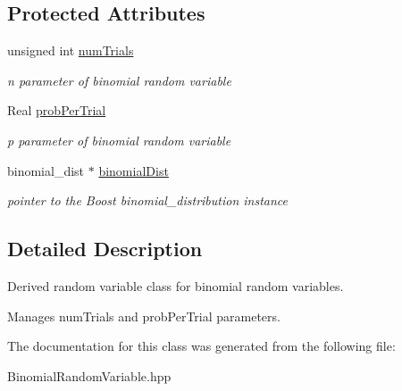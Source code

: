 \subsection*{Protected Attributes}
\begin{DoxyCompactItemize}
\item 
unsigned int \hyperlink{classPecos_1_1BinomialRandomVariable_ae7284c5049f25d6872f8fbe98c855e0c}{num\+Trials}\label{classPecos_1_1BinomialRandomVariable_ae7284c5049f25d6872f8fbe98c855e0c}

\begin{DoxyCompactList}\small\item\em n parameter of binomial random variable \end{DoxyCompactList}\item 
Real \hyperlink{classPecos_1_1BinomialRandomVariable_a034cce918fd6c1433e74212387527794}{prob\+Per\+Trial}\label{classPecos_1_1BinomialRandomVariable_a034cce918fd6c1433e74212387527794}

\begin{DoxyCompactList}\small\item\em p parameter of binomial random variable \end{DoxyCompactList}\item 
binomial\+\_\+dist $\ast$ \hyperlink{classPecos_1_1BinomialRandomVariable_ad960997d630c90336be0ddf0deda3cd0}{binomial\+Dist}\label{classPecos_1_1BinomialRandomVariable_ad960997d630c90336be0ddf0deda3cd0}

\begin{DoxyCompactList}\small\item\em pointer to the Boost binomial\+\_\+distribution instance \end{DoxyCompactList}\end{DoxyCompactItemize}


\subsection{Detailed Description}
Derived random variable class for binomial random variables. 

Manages num\+Trials and prob\+Per\+Trial parameters. 

The documentation for this class was generated from the following file\+:\begin{DoxyCompactItemize}
\item 
Binomial\+Random\+Variable.\+hpp\end{DoxyCompactItemize}
